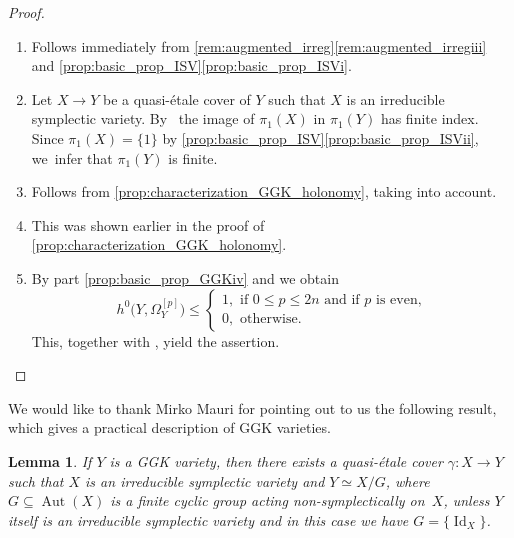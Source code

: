 \documentclass[JEP,XML,SOM,Unicode,published]{cedram}
\theoremstyle{plain}
\newtheorem{lem}[thm]{Lemma}
\theoremstyle{definition}
\DeclareMathOperator{\Id}{Id}
\DeclareMathOperator{\Aut}{Aut}
\begin{document}
\skpt
\begin{proof}
\begin{enumerate}
\item
Follows immediately from \autoref{rem:augmented_irreg}\eqref{rem:augmented_irregiii} and \autoref{prop:basic_prop_ISV}\eqref{prop:basic_prop_ISVi}.

\item
Let $X \to Y$ be a quasi-étale cover of $Y$ such that $X$ is an irreducible symplectic variety. By~\cite[Prop.\,1.3]{Campana91} the image of $\pi_1(X)$ in $\pi_1(Y)$ has finite index. Since $\pi_1(X) = \{ 1 \}$ by \autoref{prop:basic_prop_ISV}\eqref{prop:basic_prop_ISVii}, we~infer that $\pi_1(Y)$ is finite.

\item
Follows from \autoref{prop:characterization_GGK_holonomy}, taking \cite[Remind.\,2.14 \& Rem.\,5.2]{GGK19} into account.

\item
This was shown earlier in the proof of \autoref{prop:characterization_GGK_holonomy}.

\item
By part \eqref{prop:basic_prop_GGKiv} and \cite[Th.\,12.2 (12.2.2)]{GGK19} we obtain\vspace*{-3pt}
\[
h^0 \bigl(Y,\Omega_Y^{[p]} \bigr) \leq
\begin{cases}
1, \text{ if } 0 \leq p \leq 2n \text{ and if }p\text{ is even,}\\
0, \text{ otherwise}.
\end{cases}
\]
This, together with \cite[Prop.\,6.9]{GKP16b}, yield the assertion.\qedhere
\end{enumerate}
\end{proof}

We would like to thank Mirko Mauri for pointing out to us the following result, which gives a practical description of GGK varieties.

\begin{lem}
\label{lem:GGK_cover}
If $Y$ is a GGK variety, then there exists a quasi-étale cover $\gamma \colon X \to Y$ such that $X$ is an irreducible symplectic variety and $Y\simeq X/G$, where $G\subseteq \Aut(X)$ is a finite cyclic group acting non-symplectically on~$X$, unless $Y$ itself is an irreducible symplectic variety and in this case we have $G=\{ \Id_X \}$.
\end{lem}
\end{document}
